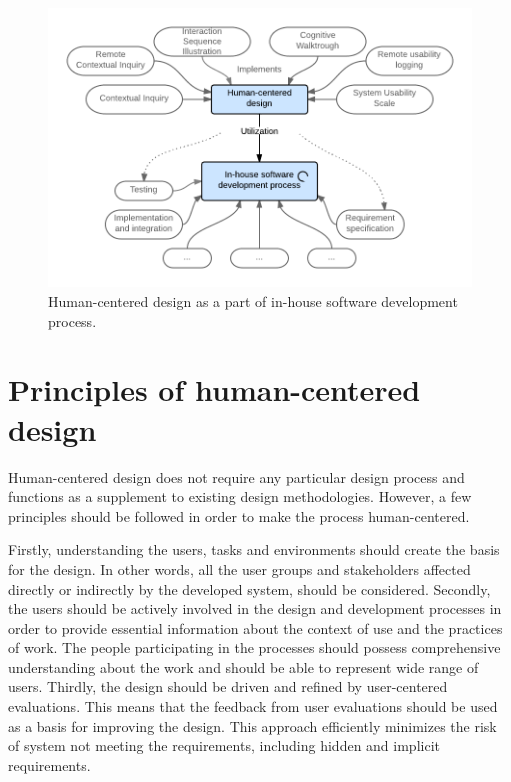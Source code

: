 \documentclass[12pt,a4paper,oneside,pdftex]{report}
\begin{document}
\begin{figure}[H]
  	\centerline{
    	\includegraphics[width=1.2\textwidth]{./images/lm_process.png}
    	}
  	\caption{Human-centered design as a part of in-house software development process.\citep{RefWorks:40}}
	\label{fig:lm_process}
\end{figure}


\section{Principles of human-centered design}
\label{sec:principles}
Human-centered design does not require any particular design process and functions as a supplement to existing design methodologies. However, a few principles should be followed in order to make the process human-centered. \citep{RefWorks:40}

Firstly, understanding the users, tasks and environments should create the basis for the design. In other words, all the user groups and stakeholders affected directly or indirectly by the developed system, should be considered.
Secondly, the users should be actively involved in the design and development processes in order to provide essential information about the context of use and the practices of work. The people participating in the processes should possess comprehensive understanding about the work and should be able to represent wide range of users. Thirdly, the design should be driven and refined by user-centered evaluations. This means that the feedback from user evaluations should be used as a basis for improving the design. This approach efficiently minimizes the risk of system not meeting the requirements, including hidden and implicit requirements. \citep{RefWorks:40}
\end{document}

